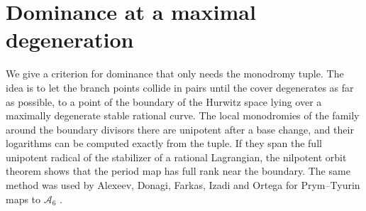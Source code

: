 \documentclass[11pt]{amsart}
\theoremstyle{definition}
\theoremstyle{remark}
\begin{document}
\section{Dominance at a maximal degeneration}\label{sec:boundary}

We give a criterion for dominance that only needs the monodromy tuple. The idea is to let the branch points collide in pairs until the cover degenerates as far as possible, to a point of the boundary of the Hurwitz space lying over a maximally degenerate stable rational curve. The local monodromies of the family around the boundary divisors there are unipotent after a base change, and their logarithms can be computed exactly from the tuple. If they span the full unipotent radical of the stabilizer of a rational Lagrangian, the nilpotent orbit theorem shows that the period map has full rank near the boundary. The same method was used by Alexeev, Donagi, Farkas, Izadi and Ortega for Prym--Tyurin maps to $\mathcal A_6$ \cite{ADFIO}.
\end{document}
